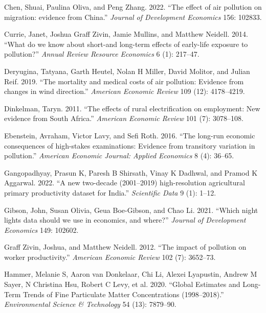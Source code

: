 \documentclass[
]{article}
\newlength{\cslhangindent}
\newlength{\cslentryspacingunit} %
\newenvironment{CSLReferences}[2] %
 {%
  \setlength{\parindent}{0pt}
  \ifodd #1
  \let\oldpar\par
  \def\par{\hangindent=\cslhangindent\oldpar}
  \fi
  \setlength{\parskip}{#2\cslentryspacingunit}
 }%
 {}
\begin{document}
\begin{CSLReferences}{1}{0}
\leavevmode{}%
Chen, Shuai, Paulina Oliva, and Peng Zhang. 2022. {``{The effect of air pollution on migration: evidence from China}.''} \emph{{Journal of Development Economics}} 156: 102833.

\leavevmode{}%
Currie, Janet, Joshua Graff Zivin, Jamie Mullins, and Matthew Neidell. 2014. {``{What do we know about short-and long-term effects of early-life exposure to pollution?}''} \emph{{Annual Review Resource Economics}} 6 (1): 217--47.

\leavevmode{}%
Deryugina, Tatyana, Garth Heutel, Nolan H Miller, David Molitor, and Julian Reif. 2019. {``{The mortality and medical costs of air pollution: Evidence from changes in wind direction}.''} \emph{{American Economic Review}} 109 (12): 4178--4219.

\leavevmode{}%
Dinkelman, Taryn. 2011. {``{The effects of rural electrification on employment: New evidence from South Africa}.''} \emph{{American Economic Review}} 101 (7): 3078--108.

\leavevmode{}%
Ebenstein, Avraham, Victor Lavy, and Sefi Roth. 2016. {``{The long-run economic consequences of high-stakes examinations: Evidence from transitory variation in pollution}.''} \emph{{American Economic Journal: Applied Economics}} 8 (4): 36--65.

\leavevmode{}%
Gangopadhyay, Prasun K, Paresh B Shirsath, Vinay K Dadhwal, and Pramod K Aggarwal. 2022. {``{A new two-decade (2001--2019) high-resolution agricultural primary productivity dataset for India}.''} \emph{{Scientific Data}} 9 (1): 1--12.

\leavevmode{}%
Gibson, John, Susan Olivia, Geua Boe-Gibson, and Chao Li. 2021. {``{Which night lights data should we use in economics, and where?}''} \emph{{Journal of Development Economics}} 149: 102602.

\leavevmode{}%
Graff Zivin, Joshua, and Matthew Neidell. 2012. {``{The impact of pollution on worker productivity}.''} \emph{{American Economic Review}} 102 (7): 3652--73.

\leavevmode{}%
Hammer, Melanie S, Aaron van Donkelaar, Chi Li, Alexei Lyapustin, Andrew M Sayer, N Christina Hsu, Robert C Levy, et al. 2020. {``Global Estimates and Long-Term Trends of Fine Particulate Matter Concentrations (1998--2018).''} \emph{{Environmental Science \& Technology}} 54 (13): 7879--90.


\end{CSLReferences}
\end{document}
